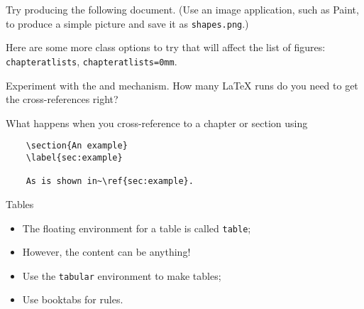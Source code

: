 \begin{exercise}
  Try producing the following document. (Use an image application,
  such as Paint, to produce a simple picture and save it as
  \texttt{shapes.png}.)
  
  Here are some more class options to try that will affect the list of
  figures: \texttt{chapteratlists}, \texttt{chapteratlists=0mm}.
  
  Experiment with the  and  mechanism. How many
  \LaTeX{} runs do you need to get the cross-references right?
  
  What happens when you cross-reference to a chapter or section using
  \begin{verbatim}
    \section{An example}
    \label{sec:example}
    
    As is shown in~\ref{sec:example}.
  \end{verbatim}
\end{exercise}

\begin{frame}{Tables}

  \begin{itemize}
    \item The floating environment for a table is called \texttt{table};
    \item However, the content can be anything!
    \item Use the \texttt{tabular} environment to make tables;
    \item Use \textsf{booktabs} for rules.
  \end{itemize}
  
\end{frame}
  
